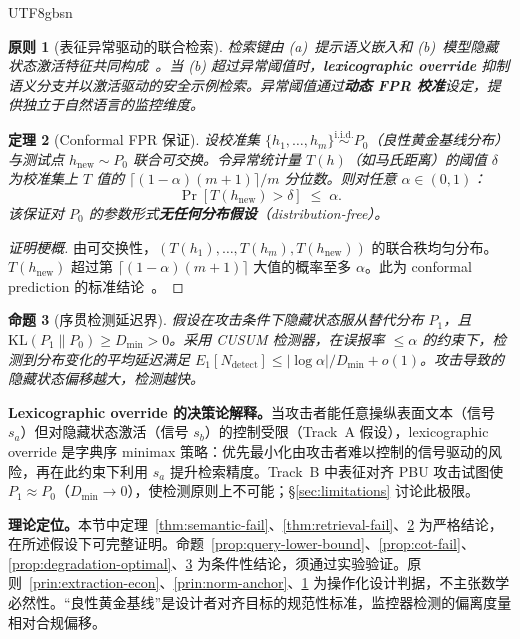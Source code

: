 \documentclass[letterpaper,twocolumn,10pt]{article}
\newtheorem{theorem}{定理}[section]
\newtheorem{proposition}[theorem]{命题}
\newtheorem{principle}[theorem]{原则}
\begin{document}
\begin{CJK}{UTF8}{gbsn}
\begin{principle}[表征异常驱动的联合检索]
\label{prin:joint-retrieval}
检索键由 (a)~提示语义嵌入和 (b)~模型隐藏状态激活特征共同构成~\cite{rep-eng}。当 (b) 超过异常阈值时，\textbf{lexicographic override} 抑制语义分支并以激活驱动的安全示例检索。异常阈值通过\textbf{动态 FPR 校准}设定，提供独立于自然语言的监控维度。
\end{principle}

\begin{theorem}[Conformal FPR 保证]
\label{thm:conformal-fpr}
设校准集 $\{h_1, \ldots, h_m\} \overset{\mathrm{i.i.d.}}{\sim} P_0$（良性黄金基线分布）与测试点 $h_{\mathrm{new}} \sim P_0$ 联合可交换。令异常统计量 $T(h)$（如马氏距离）的阈值 $\delta$ 为校准集上 $T$ 值的 $\lceil (1-\alpha)(m+1)\rceil / m$ 分位数。则对任意 $\alpha \in (0,1)$：
\begin{equation}
\Pr[T(h_{\mathrm{new}}) > \delta] \;\leq\; \alpha.
\end{equation}
该保证对 $P_0$ 的参数形式\textbf{无任何分布假设}（distribution-free）。
\end{theorem}

\begin{proof}[证明梗概]
由可交换性，$(T(h_1), \ldots, T(h_m), T(h_{\mathrm{new}}))$ 的联合秩均匀分布。$T(h_{\mathrm{new}})$ 超过第 $\lceil (1-\alpha)(m+1) \rceil$ 大值的概率至多 $\alpha$。此为 conformal prediction 的标准结论~\cite{conformal-prediction}。
\end{proof}

\begin{proposition}[序贯检测延迟界]
\label{prop:detection-delay}
假设在攻击条件下隐藏状态服从替代分布 $P_1$，且 $\mathrm{KL}(P_1 \| P_0) \geq D_{\min} > 0$。采用 CUSUM 检测器，在误报率 $\leq \alpha$ 的约束下，检测到分布变化的平均延迟满足 $E_1[N_{\mathrm{detect}}] \leq |\!\log \alpha| / D_{\min} + o(1)$。攻击导致的隐藏状态偏移越大，检测越快。
\end{proposition}

\noindent\textbf{Lexicographic override 的决策论解释。}当攻击者能任意操纵表面文本（信号 $s_a$）但对隐藏状态激活（信号 $s_b$）的控制受限（Track~A 假设），lexicographic override 是字典序 minimax 策略：优先最小化由攻击者难以控制的信号驱动的风险，再在此约束下利用 $s_a$ 提升检索精度。Track~B 中表征对齐 PBU 攻击试图使 $P_1 \approx P_0$（$D_{\min} \to 0$），使检测原则上不可能；\S\ref{sec:limitations} 讨论此极限。

\noindent\textbf{理论定位。}本节中定理~\ref{thm:semantic-fail}、\ref{thm:retrieval-fail}、\ref{thm:conformal-fpr} 为严格结论，在所述假设下可完整证明。命题~\ref{prop:query-lower-bound}、\ref{prop:cot-fail}、\ref{prop:degradation-optimal}、\ref{prop:detection-delay} 为条件性结论，须通过实验验证。原则~\ref{prin:extraction-econ}、\ref{prin:norm-anchor}、\ref{prin:joint-retrieval} 为操作化设计判据，不主张数学必然性。``良性黄金基线''是设计者对齐目标的规范性标准，监控器检测的偏离度量相对合规偏移。


\end{CJK}
\end{document}
